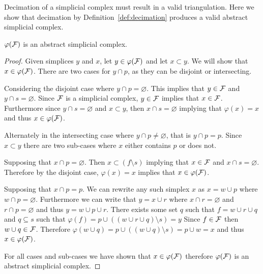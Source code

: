		\par Decimation of a simplicial complex must result in a valid triangulation. Here we show that decimation by Definition~\ref{def:decimation} produces a valid abstract simplicial complex.
		\begin{theorem}
			$\varphi(\mathcal{F})$ is an abstract simplicial complex.
		\end{theorem}
		\begin{proof}
			Given simplices $y$ and $x$, let $y \in \varphi(\mathcal{F})$ and let $x \subset y$. We will show that $x \in \varphi(\mathcal{F})$.
			\smallskip
			There are two cases for $y \cap p$, as they can be disjoint or intersecting.

			Considering the disjoint case where $y \cap p = \varnothing$.
			This implies that $y \in \mathcal{F}$ and $y \cap s = \varnothing$.
			Since $\mathcal{F}$ is a simplicial complex, $y \in \mathcal{F}$ implies that $x \in \mathcal{F}$.
			Furthermore since $y \cap s = \varnothing$ and $x \subset y$, then $x \cap s = \varnothing$ implying that $\varphi(x) = x$ and thus $x \in \varphi(\mathcal{F})$.

			Alternately in the intersecting case where $y \cap p \neq \varnothing$, that is $y \cap p = p$.
			Since $x \subset y$ there are two sub-cases where $x$ either contains $p$ or does not.

			Supposing that $x \cap p = \varnothing$.
			Then $x \subset (f \setminus s)$ implying that $x \in \mathcal{F}$ and $x \cap s = \varnothing$.
			Therefore by the disjoint case, $\varphi(x) = x$ implies that $x \in \varphi(\mathcal{F})$.

			Supposing that $x \cap p = p$.
			We can rewrite any such simplex $x$ as $x = w \cup p$ where $w \cap p = \varnothing$.
			Furthermore we can write that $y = x \cup r$ where $x \cap r = \varnothing$ and $r\cap p = \varnothing$ and thus $y = w\cup p \cup r$.
			There exists some set $q$ such that $f = w \cup r \cup q$ and $q \subseteq s$ such that $\varphi(f) = p\cup ((w\cup r \cup q)\setminus s) = y$
			Since $f\in \mathcal{F}$ then $w\cup q \in \mathcal{F}$.
			Therefore $\varphi(w\cup q) = p\cup((w\cup q)\setminus s) = p \cup w = x$ and thus $x \in \varphi(\mathcal{F})$.

			For all cases and sub-cases we have shown that $x \in \varphi(\mathcal{F})$ therefore $\varphi(\mathcal{F})$ is an abstract simplicial complex.
		\end{proof}

